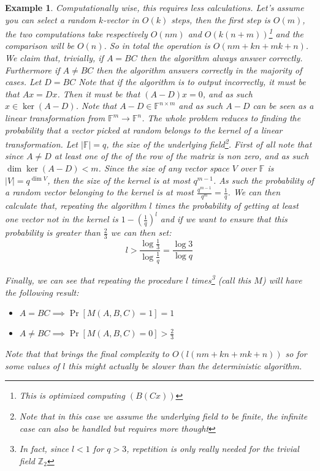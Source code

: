 \documentclass{article}
\newtheorem{example}{Example}
\begin{document}
\begin{example}
Computationally wise, this requires less calculations. Let's assume you can select a random $k$-vector in $O(k)$ steps, then the first step is $O(m)$, the two computations take respectively $O(nm)$ and $O(k (n + m))$\footnote{This is optimized computing $(B(Cx))$} and the comparison will be $O(n)$. So in total the operation is $O(nm + kn + mk + n)$. We claim that, trivially, if $A = BC$ then the algorithm always answer correctly. Furthermore if $A \neq BC$ then the algorithm answers correctly in the majority of cases. Let $D = BC$ Note that if the algorithm is to output incorrectly, it must be that $Ax = Dx$. Then it must be that $(A - D) x = 0$, and as such $x \in \ker(A - D)$. Note that $A - D \in \mathbb{F}^{n \times m}$ and as such $A - D$ can be seen as a linear transformation from $\mathbb{F}^m \to \mathbb{F}^n$. The whole problem reduces to finding the probability that a vector picked at random belongs to the kernel of a linear transformation. Let $|\mathbb{F}| = q$, the size of the underlying field\footnote{Note that in this case we assume the underlying field to be finite, the infinite case can also be handled but requires more thought}. First of all note that since $A \neq D$ at least one of the of the row of the matrix is non zero, and as such $\dim \ker (A - D) < m$. Since the size of any vector space $V$ over $\mathbb{F}$ is $|V| = q^{\dim V}$, then the size of the kernel is at most $q^{m - 1}$. As such the probability of a random vector belonging to the kernel is at most $\frac{q^{m-1}}{q^m}=\frac{1}{q}$. We can then calculate that, repeating the algorithm $l$ times the probability of getting at least one vector not in the kernel is $1 - \left(\frac{1}{q}\right)^l$ and if we want to ensure that this probability is greater than $\frac{2}{3}$ we can then set:
\[l > \frac{\log \frac{1}{3}}{\log \frac{1}{q}} = \frac{\log{3}}{\log{q}}\]

Finally, we can see that repeating the procedure $l$ times\footnote{In fact, since $l < 1$ for $q > 3$, repetition is only really needed for the trivial field $\mathbb{Z}_2$} (call this $M$) will have the following result:
\begin{itemize}
    \item $A = BC \implies \Pr[M(A, B,C) = 1] = 1$
    \item $A \neq BC \implies \Pr[M(A, B,C) = 0] > \frac{2}{3}$
\end{itemize}

Note that that brings the final complexity to $O(l(nm + kn + mk + n))$ so for some values of $l$ this might actually be slower than the deterministic algorithm.

\end{example}
\end{document}
